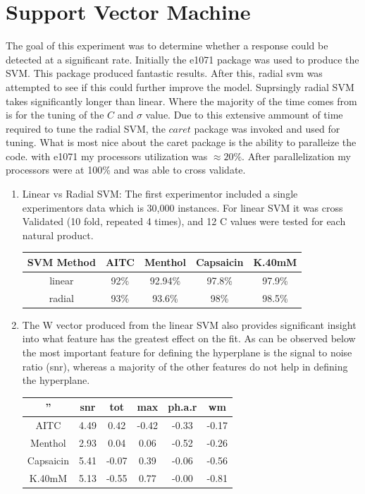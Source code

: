 \documentclass[11pt, fullpage,letterpaper]{article}
\begin{document}
\section{Support Vector Machine}

The goal of this experiment was to determine whether a response could be detected at a significant rate. Initially the e1071 package was used to produce the SVM. This package produced fantastic results. After this, radial svm was attempted to see if this could further improve the model. Suprsingly radial SVM takes significantly longer than linear. Where the majority of the time comes from is for the tuning of the $C$ and $\sigma$ value. Due to this extensive ammount of time required to tune the radial SVM, the $caret$ package was invoked and used for tuning.  What is most nice about the caret package is the ability to paralleize the code. with e1071 my processors utilization was $\approx 20\%$. After parallelization my processors were at 100\% and was able to cross validate.

\begin{enumerate}
	\item Linear vs Radial SVM: The first experimentor included a single experimentors data which is 30,000 instances. For linear SVM it was cross Validated (10 fold, repeated 4 times), and 12 C values were tested for each natural product.
		\begin{center}
		\begin{tabular} {c|cccc}
			SVM Method & AITC & Menthol & Capsaicin & K.40mM \\ \hline \hline
			linear & 92\% & 92.94\% & 97.8\% & 97.9\% \\ \hline
			radial & 93\% & 93.6\% & 98\% & 98.5\% \\ \hline
		\end{tabular}
	\end{center}	
	\item The W vector produced from the linear SVM also provides significant insight into what feature has the greatest effect on the fit. As can be observed below the most important feature for defining the hyperplane is the signal to noise ratio (snr), whereas a majority of the other features do not help in defining the hyperplane.
	\begin{center}
		\begin{tabular}{c|ccccc}
			''& snr & tot & max & ph.a.r & wm \\ \hline \hline
			AITC & 4.49 & 0.42 & -0.42 & -0.33 & -0.17 \\ \hline
			Menthol & 2.93 & 0.04 & 0.06 & -0.52 & -0.26 \\ \hline
			Capsaicin & 5.41 & -0.07 & 0.39 & -0.06 & -0.56 \\ \hline
			K.40mM & 5.13 & -0.55 & 0.77 & -0.00 & -0.81 \\ \hline
		\end{tabular}
	\end{center}
\end{enumerate}
\end{document}

